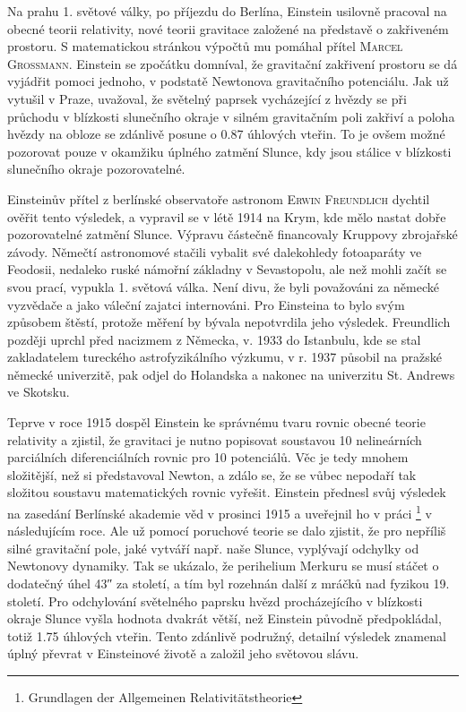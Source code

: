         Na prahu 1. světové války, po příjezdu do Berlína, Einstein usilovně pracoval na obecné
        teorii relativity, nové teorii gravitace založené na představě o zakřiveném prostoru. S
        matematickou stránkou výpočtů mu pomáhal přítel \textsc{Marcel Grossmann}. Einstein se
        zpočátku domníval, že gravitační zakřivení prostoru se dá vyjádřit pomoci jednoho, v
        podstatě Newtonova gravitačního potenciálu. Jak už vytušil v Praze, uvažoval, že světelný
        paprsek vycházející z hvězdy se při průchodu v blízkosti slunečního okraje v silném
        gravitačním poli zakřiví a poloha hvězdy na obloze se zdánlivě posune o \num{0.87} úhlových
        vteřin. To je ovšem možné pozorovat pouze v okamžiku úplného zatmění Slunce, kdy jsou
        stálice v blízkosti slunečního okraje pozorovatelné.

        Einsteinův přítel z berlínské observatoře astronom \textsc{Erwin Freundlich} dychtil ověřit
        tento výsledek, a vypravil se v létě 1914 na Krym, kde mělo nastat dobře pozorovatelné
        zatmění Slunce. Výpravu částečně financovaly Kruppovy zbrojařské závody. Němečtí astronomové
        stačili vybalit své dalekohledy fotoaparáty ve Feodosii, nedaleko ruské námořní základny v
        Sevastopolu, ale než mohli začít se svou prací, vypukla 1. světová válka. Není divu, že byli
        považováni za německé vyzvědače a jako váleční zajatci internováni. Pro Einsteina to bylo
        svým způsobem štěstí, protože měření by bývala nepotvrdila jeho výsledek. Freundlich později
        uprchl před nacizmem z Německa, v. 1933 do Istanbulu, kde se stal zakladatelem tureckého
        astrofyzikálního výzkumu, v r. 1937 působil na pražské německé univerzitě, pak odjel do
        Holandska a nakonec na univerzitu St. Andrews ve Skotsku.

        Teprve v roce 1915 dospěl Einstein ke správnému tvaru rovnic obecné teorie relativity a
        zjistil, že gravitaci je nutno popisovat soustavou 10 nelineárních parciálních
        diferenciálních rovnic pro 10 potenciálů. Věc je tedy mnohem složitější, než si představoval
        Newton, a zdálo se, že se vůbec nepodaří tak složitou soustavu matematických rovnic vyřešit.
        Einstein přednesl svůj výsledek na zasedání Berlínské akademie věd v prosinci 1915 a
        uveřejnil ho v práci \emph{}\footnote{Grundlagen der
        Allgemeinen Relativitätstheorie} v následujícím roce. Ale už pomocí poruchové teorie se dalo
        zjistit, že pro nepříliš silné gravitační pole, jaké vytváří např. naše Slunce, vyplývají
        odchylky od Newtonovy dynamiky. Tak se ukázalo, že perihelium Merkuru se musí stáčet o
        dodatečný úhel \ang{;;43} za století, a tím byl rozehnán další z mráčků nad fyzikou 19.
        století. Pro odchylování světelného paprsku hvězd procházejícího v blízkosti okraje Slunce
        vyšla hodnota dvakrát větší, než Einstein původně předpokládal, totiž \num{1.75} úhlových
        vteřin. Tento zdánlivě podružný, detailní výsledek znamenal úplný převrat v Einsteinové
        životě a založil jeho světovou slávu.

